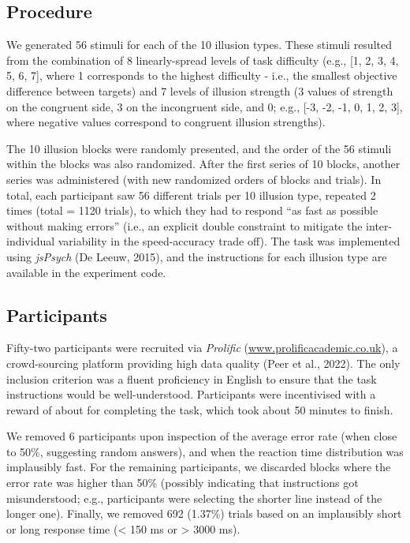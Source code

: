 \documentclass[
  man,floatsintext]{apa6}
\begin{document}
\hypertarget{procedure}{%
\subsection{Procedure}\label{procedure}}

We generated 56 stimuli for each of the 10 illusion types. These stimuli resulted from the combination of 8 linearly-spread levels of task difficulty (e.g., {[}1, 2, 3, 4, 5, 6, 7{]}, where 1 corresponds to the highest difficulty - i.e., the smallest objective difference between targets) and 7 levels of illusion strength (3 values of strength on the congruent side, 3 on the incongruent side, and 0; e.g., {[}-3, -2, -1, 0, 1, 2, 3{]}, where negative values correspond to congruent illusion strengths).

The 10 illusion blocks were randomly presented, and the order of the 56 stimuli within the blocks was also randomized. After the first series of 10 blocks, another series was administered (with new randomized orders of blocks and trials). In total, each participant saw 56 different trials per 10 illusion type, repeated 2 times (total = 1120 trials), to which they had to respond ``as fast as possible without making errors'' (i.e., an explicit double constraint to mitigate the inter-individual variability in the speed-accuracy trade off). The task was implemented using \emph{jsPsych} (De Leeuw, 2015), and the instructions for each illusion type are available in the experiment code.

\hypertarget{participants}{%
\subsection{Participants}\label{participants}}

Fifty-two participants were recruited via \emph{Prolific} (\url{www.prolificacademic.co.uk}), a crowd-sourcing platform providing high data quality (Peer et al., 2022). The only inclusion criterion was a fluent proficiency in English to ensure that the task instructions would be well-understood. Participants were incentivised with a reward of about  for completing the task, which took about 50 minutes to finish.

We removed 6 participants upon inspection of the average error rate (when close to 50\%, suggesting random answers), and when the reaction time distribution was implausibly fast. For the remaining participants, we discarded blocks where the error rate was higher than 50\% (possibly indicating that instructions got misunderstood; e.g., participants were selecting the shorter line instead of the longer one). Finally, we removed 692 (1.37\%) trials based on an implausibly short or long response time (\textless{} 150 ms or \textgreater{} 3000 ms).
\end{document}
